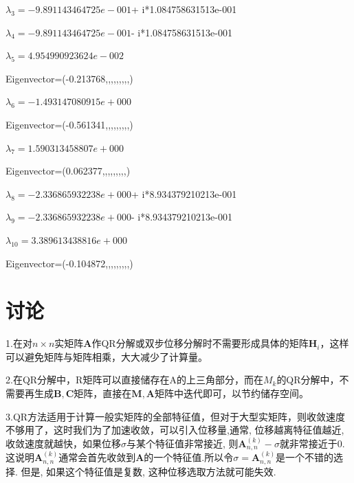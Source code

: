 \vbox{}
$\lambda_{3}= -9.891143464725e-001$+ i*1.084758631513e-001


\vbox{}
$\lambda_{4}= -9.891143464725e-001$- i*1.084758631513e-001


\vbox{}
$\lambda_{5}= 4.954990923624e-002$ 

Eigenvector=(-0.213768,,,,,,,,,)


\vbox{}
$\lambda_{6}= -1.493147080915e+000$ 

Eigenvector=(-0.561341,,,,,,,,,)


\vbox{}
$\lambda_{7}= 1.590313458807e+000$ 

Eigenvector=(0.062377,,,,,,,,,)


\vbox{}
$\lambda_{8}= -2.336865932238e+000$+ i*8.934379210213e-001


\vbox{}
$\lambda_{9}= -2.336865932238e+000$- i*8.934379210213e-001


\vbox{}
$\lambda_{10}= 3.389613438816e+000$ 

Eigenvector=(-0.104872,,,,,,,,,)

\chapter{讨论}
\normalsize
1.在对$n\times n$实矩阵$\bm{A}$作QR分解或双步位移分解时不需要形成具体的矩阵$\bm{H}_i$，这样可以避免矩阵与矩阵相乘，大大减少了计算量。

2.在QR分解中，R矩阵可以直接储存在A的上三角部分，而在$M_k$的QR分解中，不需要再生成$\bm{B},\bm{C}$矩阵，直接在$\bm{M},\bm{A}$矩阵中迭代即可，以节约储存空间。

3.QR方法适用于计算一般实矩阵的全部特征值，但对于大型实矩阵，则收敛速度不够用了，这时我们为了加速收敛，可以引入位移量,通常, 位移越离特征值越近,收敛速度就越快，如果位移$\sigma$与某个特征值非常接近, 则$\bm{A}_{n,n}^{(k)}-\sigma$就非常接近于0.
这说明$\bm{A}_{n,n}^{(k)}$通常会首先收敛到$\bm{A}$的一个特征值.所以令$\sigma=\bm{A}_{n,n}^{(k)}$是一个不错的选择.
但是, 如果这个特征值是复数, 这种位移选取方法就可能失效.

